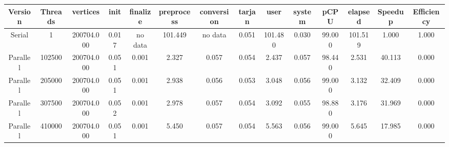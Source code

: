 \begin{tabular}{|c|c|c|c|c|c|c|c|c|c|c|c|c|c|}
\toprule
 Version &  Threads &   vertices &  init & finalize &  preprocess & conversion &  tarjan &    user &  system &   pCPU &  elapsed &  Speedup &  Efficiency \\
\midrule
  Serial &        1 & 200704.000 & 0.017 &  no data &     101.449 &    no data &   0.051 & 101.480 &   0.030 & 99.000 &  101.519 &    1.000 &       1.000 \\
Parallel &   102500 & 200704.000 & 0.051 &    0.001 &       2.327 &      0.057 &   0.054 &   2.437 &   0.057 & 98.440 &    2.531 &   40.113 &       0.000 \\
Parallel &   205000 & 200704.000 & 0.051 &    0.001 &       2.938 &      0.056 &   0.053 &   3.048 &   0.056 & 99.000 &    3.132 &   32.409 &       0.000 \\
Parallel &   307500 & 200704.000 & 0.052 &    0.001 &       2.978 &      0.057 &   0.054 &   3.092 &   0.055 & 98.880 &    3.176 &   31.969 &       0.000 \\
Parallel &   410000 & 200704.000 & 0.051 &    0.001 &       5.450 &      0.057 &   0.054 &   5.563 &   0.056 & 99.000 &    5.645 &   17.985 &       0.000 \\
\bottomrule
\end{tabular}
